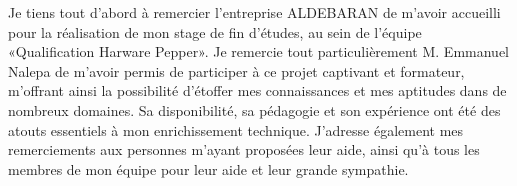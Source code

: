 Je tiens tout d’abord à remercier l’entreprise ALDEBARAN de m’avoir accueilli pour la réalisation de mon stage de fin d'études, au sein de l'équipe «Qualification Harware Pepper».
Je remercie tout particulièrement M. Emmanuel Nalepa de m'avoir permis de participer à ce projet captivant et formateur, m’offrant ainsi la possibilité d'étoffer mes connaissances et mes aptitudes dans de nombreux domaines. Sa disponibilité, sa pédagogie et son expérience ont été des atouts essentiels à mon enrichissement technique.
J’adresse également mes remerciements aux personnes m'ayant proposées leur aide, ainsi qu'à tous les membres de mon équipe pour leur aide et leur grande sympathie.